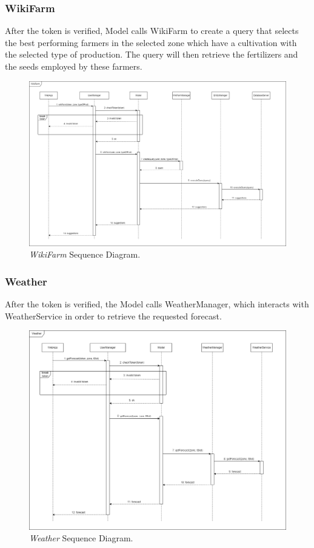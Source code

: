 \subsubsection{WikiFarm}
After the token is verified, Model calls WikiFarm to create a query that selects the best performing farmers in the selected zone which have a cultivation with the selected type of production. The query will then retrieve the fertilizers and the seeds employed by these farmers.
\begin{figure}[H]
    \centering
    \includegraphics[width=\textwidth]{Images/Sequence Diagram/WikiFarm.png}
    \caption{\textit{WikiFarm} Sequence Diagram.}
\end{figure}
\newpage
\subsubsection{Weather}
After the token is verified, the Model calls WeatherManager, which interacts with WeatherService in order to retrieve the requested forecast.
\begin{figure}[H]
    \centering
    \includegraphics[width=\textwidth]{Images/Sequence Diagram/Weather.png}
    \caption{\textit{Weather} Sequence Diagram.}
\end{figure}
\newpage
